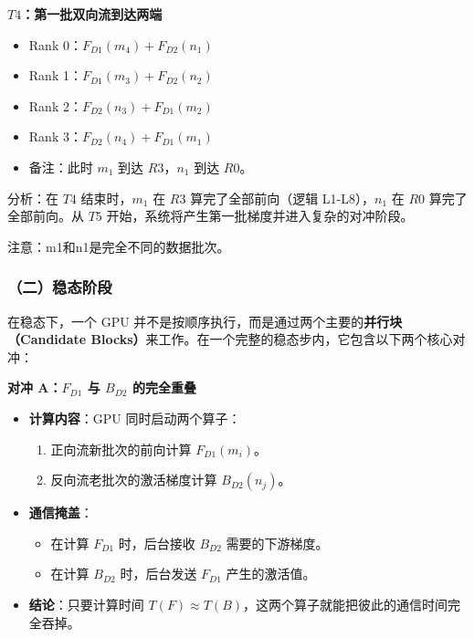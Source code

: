 \textbf{\(T4\)：第一批双向流到达两端}

\begin{itemize}
\tightlist
\item
  Rank 0：\(F_{D1}(m_4)+F_{D2}(n_1)\)
\item
  Rank 1：\(F_{D1}(m_3)+F_{D2}(n_2)\)
\item
  Rank 2：\(F_{D2}(n_3)+F_{D1}(m_2)\)
\item
  Rank 3：\(F_{D2}(n_4)+F_{D1}(m_1)\)
\item
  备注：此时 \(m_1\) 到达 \(R3\)，\(n_1\) 到达 \(R0\)。
\end{itemize}

分析：在 \(T4\) 结束时，\(m_1\) 在 \(R3\) 算完了全部前向（逻辑 L1-L8），\(n_1\) 在 \(R0\) 算完了全部前向。从 \(T5\) 开始，系统将产生第一批梯度并进入复杂的对冲阶段。

注意：m1和n1是完全不同的数据批次。

\hypertarget{ux4e8cux7a33ux6001ux9636ux6bb5}{%
\subsubsection{（二）稳态阶段}\label{ux4e8cux7a33ux6001ux9636ux6bb5}}

在稳态下，一个 GPU 并不是按顺序执行，而是通过两个主要的\textbf{并行块（Candidate Blocks）}来工作。在一个完整的稳态步内，它包含以下两个核心对冲：

\textbf{对冲 A：\(F_{D1}\) 与 \(B_{D2}\) 的完全重叠}

\begin{itemize}
\tightlist
\item
{}
  \textbf{计算内容}：GPU 同时启动两个算子：

  \begin{enumerate}
  \def\labelenumi{\arabic{enumi}.}
  \tightlist
  \item
    正向流新批次的前向计算 \(F_{D1}(m_i)\)。
  \item
    反向流老批次的激活梯度计算 \(B_{D2}(n_j)\)。
  \end{enumerate}
\item
{}
  \textbf{通信掩盖}：

  \begin{itemize}
  \tightlist
  \item
    在计算 \(F_{D1}\) 时，后台接收 \(B_{D2}\) 需要的下游梯度。
  \item
    在计算 \(B_{D2}\) 时，后台发送 \(F_{D1}\) 产生的激活值。
  \end{itemize}
\item
  \textbf{结论}：只要计算时间 \(T(F) \approx T(B)\)，这两个算子就能把彼此的通信时间完全吞掉。
\end{itemize}

